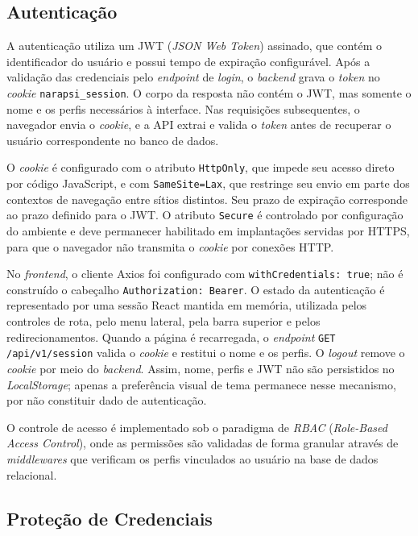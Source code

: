 \subsection{Autenticação} 

A autenticação utiliza um JWT (\textit{JSON Web Token}) assinado, que contém o identificador do usuário e possui tempo de expiração configurável. Após a validação das credenciais pelo \textit{endpoint} de \textit{login}, o \textit{backend} grava o \textit{token} no \textit{cookie} \texttt{narapsi\_session}. O corpo da resposta não contém o JWT, mas somente o nome e os perfis necessários à interface. Nas requisições subsequentes, o navegador envia o \textit{cookie}, e a API extrai e valida o \textit{token} antes de recuperar o usuário correspondente no banco de dados.

O \textit{cookie} é configurado com o atributo \texttt{HttpOnly}, que impede seu acesso direto por código JavaScript, e com \texttt{SameSite=Lax}, que restringe seu envio em parte dos contextos de navegação entre sítios distintos. Seu prazo de expiração corresponde ao prazo definido para o JWT. O atributo \texttt{Secure} é controlado por configuração do ambiente e deve permanecer habilitado em implantações servidas por HTTPS, para que o navegador não transmita o \textit{cookie} por conexões HTTP.

No \textit{frontend}, o cliente Axios foi configurado com \texttt{withCredentials: true}; não é construído o cabeçalho \texttt{Authorization: Bearer}. O estado da autenticação é representado por uma sessão React mantida em memória, utilizada pelos controles de rota, pelo menu lateral, pela barra superior e pelos redirecionamentos. Quando a página é recarregada, o \textit{endpoint} \texttt{GET /api/v1/session} valida o \textit{cookie} e restitui o nome e os perfis. O \textit{logout} remove o \textit{cookie} por meio do \textit{backend}. Assim, nome, perfis e JWT não são persistidos no \textit{LocalStorage}; apenas a preferência visual de tema permanece nesse mecanismo, por não constituir dado de autenticação.

O controle de acesso é implementado sob o paradigma de \textit{RBAC} (\textit{Role-Based Access Control}), onde as permissões são validadas de forma granular através de \textit{middlewares} que verificam os perfis vinculados ao usuário na base de dados relacional.

\subsection{Proteção de Credenciais} 

